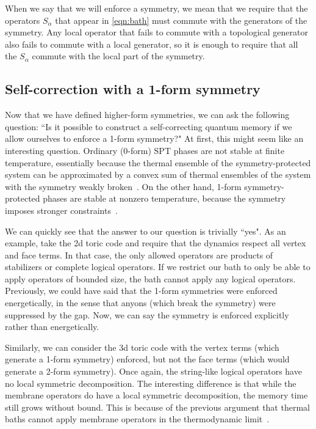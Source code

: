 When we say that we will enforce a symmetry, we mean that we require that the operators $S_\alpha$ that appear in \eqref{eqn:bath} must commute with the generators of the symmetry. Any local operator that fails to commute with a topological generator also fails to commute with a local generator, so it is enough to require that all the $S_\alpha$ commute with the local part of the symmetry. 

\subsection{Self-correction with a 1-form symmetry} \label{sub:RB}

Now that we have defined higher-form symmetries, we can ask the following question: ``Is it possible to construct a self-correcting quantum memory if we allow ourselves to enforce a 1-form symmetry?" At first, this might seem like an interesting question. Ordinary (0-form) SPT phases are not stable at finite temperature, essentially because the thermal ensemble of the symmetry-protected system can be approximated by a convex sum of thermal ensembles of the system with the symmetry weakly broken~\cite{Roberts2017SPTO}. On the other hand,
1-form symmetry-protected phases are stable at nonzero temperature, because the symmetry imposes stronger constraints~\cite{Roberts2017SPTO}. 

We can quickly see that the answer to our question is trivially ``yes". As an example, take the 2d toric code and require that the dynamics respect all vertex and face terms. In that case, the only allowed operators are products of stabilizers or complete logical operators. If we restrict our bath to only be able to apply operators of bounded size, the bath cannot apply any logical operators. Previously, we could have said that the 1-form symmetries were enforced energetically, in the sense that anyons (which break the symmetry) were suppressed by the gap. Now, we can say the symmetry is enforced explicitly rather than energetically.

Similarly, we can consider the 3d toric code with the vertex terms (which generate a 1-form symmetry) enforced, but not the face terms (which would generate a 2-form symmetry). Once again, the string-like logical operators have no local symmetric decomposition. The interesting difference is that while the membrane operators do have a local symmetric decomposition, the memory time still grows without bound. This is because of the previous argument that thermal baths cannot apply membrane operators in the thermodynamic limit~\cite{Dennis2002Topological, CastelnovoChamon2008}.

